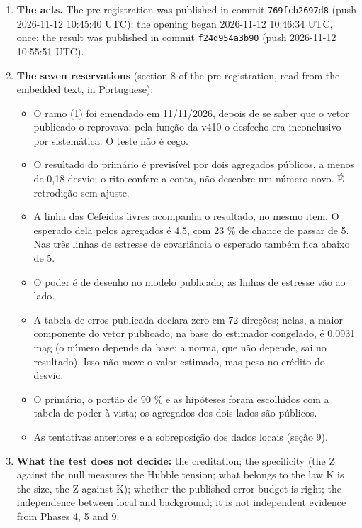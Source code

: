 \begin{center}
{{\begin{enumerate}
\item \textbf{The acts.} The pre-registration was published in commit \texttt{769fcb2697d8} (push 2026-11-12 10:45:40 UTC); the opening began 2026-11-12 10:46:34 UTC, once; the result was published in commit \texttt{f24d954a3b90} (push 2026-11-12 10:55:51 UTC).
\item \textbf{The seven reservations} (section 8 of the pre-registration, read from the embedded text, in Portuguese): \begin{itemize}\setlength{\itemsep}{0pt}\item[1.] O ramo (1) foi emendado em 11/11/2026, depois de se saber que o vetor publicado o reprovava; pela função da v410 o desfecho era inconclusivo por sistemática. O teste não é cego.\item[2.] O resultado do primário é previsível por dois agregados públicos, a menos de 0,18 desvio; o rito confere a conta, não descobre um número novo. É retrodição sem ajuste.\item[3.] A linha das Cefeidas livres acompanha o resultado, no mesmo item. O esperado dela pelos agregados é 4,5, com 23 \% de chance de passar de 5. Nas três linhas de estresse de covariância o esperado também fica abaixo de 5.\item[4.] O poder é de desenho no modelo publicado; as linhas de estresse vão ao lado.\item[5.] A tabela de erros publicada declara zero em 72 direções; nelas, a maior componente do vetor publicado, na base do estimador congelado, é 0,0931 mag (o número depende da base; a norma, que não depende, sai no resultado). Isso não move o valor estimado, mas pesa no crédito do desvio.\item[6.] O primário, o portão de 90 \% e as hipóteses foram escolhidos com a tabela de poder à vista; os agregados dos dois lados são públicos.\item[7.] As tentativas anteriores e a sobreposição dos dados locais (seção 9).\end{itemize}
\item \textbf{What the test does not decide:} the creditation; the specificity (the Z against the null measures the Hubble tension; what belongs to the law K is the size, the Z against K); whether the published error budget is right; the independence between local and background; it is not independent evidence from Phases 4, 5 and 9.

\end{enumerate}}}
\end{center}
